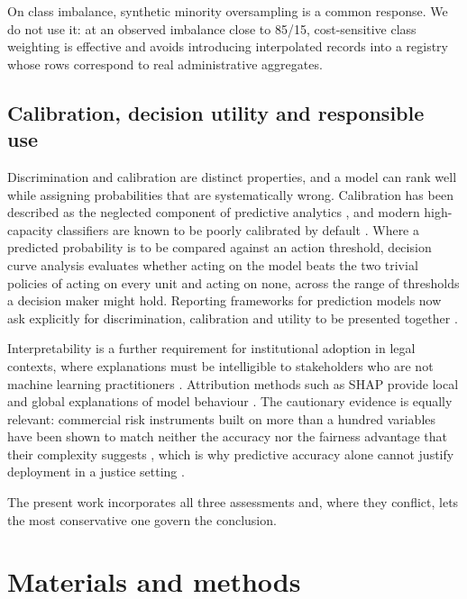 \documentclass[sn-vancouver,Numbered]{sn-jnl}
\begin{document}
On class imbalance, synthetic minority oversampling \cite{chawla_smote_2002} is a common response. We do not use it: at an observed imbalance close to 85/15, cost-sensitive class weighting is effective and avoids introducing interpolated records into a registry whose rows correspond to real administrative aggregates.

\subsection{Calibration, decision utility and responsible use}

Discrimination and calibration are distinct properties, and a model can rank well while assigning probabilities that are systematically wrong. Calibration has been described as the neglected component of predictive analytics \cite{vancalster_calibration_2019}, and modern high-capacity classifiers are known to be poorly calibrated by default \cite{guo_calibration_2017,niculescu_predicting_2005}. Where a predicted probability is to be compared against an action threshold, decision curve analysis \cite{vickers_decision_2006} evaluates whether acting on the model beats the two trivial policies of acting on every unit and acting on none, across the range of thresholds a decision maker might hold. Reporting frameworks for prediction models now ask explicitly for discrimination, calibration and utility to be presented together \cite{collins_tripod_2024,steyerberg_assessing_2010}.

Interpretability is a further requirement for institutional adoption in legal contexts, where explanations must be intelligible to stakeholders who are not machine learning practitioners \cite{richmond_explainable_2024,saarela_recent_2024}. Attribution methods such as SHAP provide local and global explanations of model behaviour \cite{lundberg_unified_2017}. The cautionary evidence is equally relevant: commercial risk instruments built on more than a hundred variables have been shown to match neither the accuracy nor the fairness advantage that their complexity suggests \cite{dressel_accuracy_2018}, which is why predictive accuracy alone cannot justify deployment in a justice setting \cite{taylor_is_2025}.

The present work incorporates all three assessments and, where they conflict, lets the most conservative one govern the conclusion.

\section{Materials and methods}\label{sec:methods}
\end{document}
